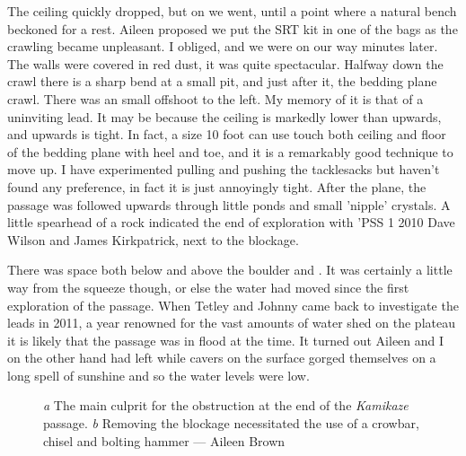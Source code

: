 The ceiling quickly dropped, but on we went, until a point where a natural bench beckoned for a rest. Aileen proposed we put the SRT kit in one of the bags as the crawling became unpleasant. I obliged, and we were on our way minutes later. The walls were covered in red dust, it was quite spectacular. Halfway down the crawl there is a sharp bend at a small pit, and just after it, the bedding plane crawl. There was an small offshoot to the left. My memory of it is that of a uninviting lead. It may be because the ceiling is markedly lower than upwards, and upwards is tight. In fact, a size 10 foot can use touch both ceiling and floor of the bedding plane with heel and toe, and it is a remarkably good technique to move up. I have experimented pulling and pushing the tacklesacks but haven't found any preference, in fact it is just annoyingly tight. After the plane, the passage was followed upwards through little ponds and small 'nipple' crystals. A little spearhead of a rock indicated the end of exploration with 'PSS  1 2010 Dave Wilson and James Kirkpatrick, next to the blockage.


There was space both below and above the boulder and . It was certainly a little way from the squeeze though, or else the water had moved since the first exploration of the passage. When Tetley and Johnny came back to investigate the leads in 2011, a year renowned for the vast amounts of water shed on the plateau it is likely that the passage was in flood at the time. It turned out Aileen and I on the other hand had left while cavers on the surface gorged themselves on a long spell of sunshine and so the water levels were low.

\begin{figure}[t!]
\checkoddpage \ifoddpage \forcerectofloat \else \forceversofloat \fi
\centering
    \begin{subfigure}[t]{0.423\textwidth}
        \centering
        \caption{} \label{boulder_kamikaze}
    \end{subfigure}
        \hfill
\begin{subfigure}[t]{0.567\textwidth}
\centering
{}
 \caption{}\label{end of kamikaze}
\end{subfigure}
  \caption{
    \emph{a} The main culprit for the obstruction at the end of the \emph{Kamikaze} passage. 
     \emph{b}  Removing the blockage necessitated the use of a crowbar, chisel and bolting hammer --- Aileen Brown }
\end{figure}


